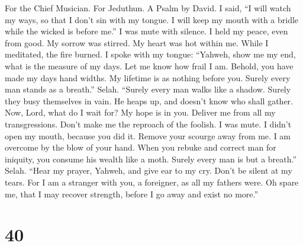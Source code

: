 For the Chief Musician. For Jeduthun. A Psalm by David.  I
said, ``I will watch my ways, so that I don't sin with my tongue. I will
keep my mouth with a bridle while the wicked is before me.''
 I was mute with silence. I held my peace, even from good.
My sorrow was stirred.  My heart was hot within me. While I
meditated, the fire burned. I spoke with my tongue: 
``Yahweh, show me my end, what is the measure of my days. Let me know
how frail I am.  Behold, you have made my days hand widths.
My lifetime is as nothing before you. Surely every man stands as a
breath.'' Selah.  ``Surely every man walks like a shadow.
Surely they busy themselves in vain. He heaps up, and doesn't know who
shall gather.  Now, Lord, what do I wait for? My hope is in
you.  Deliver me from all my transgressions. Don't make me
the reproach of the foolish.  I was mute. I didn't open my
mouth, because you did it.  Remove your scourge away from
me. I am overcome by the blow of your hand.  When you
rebuke and correct man for iniquity, you consume his wealth like a moth.
Surely every man is but a breath.'' Selah.  ``Hear my
prayer, Yahweh, and give ear to my cry. Don't be silent at my tears. For
I am a stranger with you, a foreigner, as all my fathers were.
 Oh spare me, that I may recover strength, before I go away
and exist no more.''

\hypertarget{section-39}{%
\section{40}\label{section-39}}

